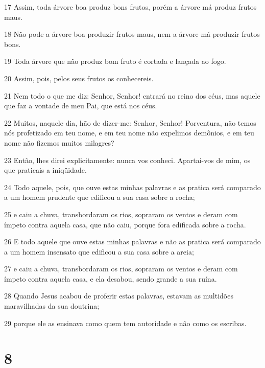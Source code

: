 \par 17 Assim, toda árvore boa produz bons frutos, porém a árvore má produz frutos maus.
\par 18 Não pode a árvore boa produzir frutos maus, nem a árvore má produzir frutos bons.
\par 19 Toda árvore que não produz bom fruto é cortada e lançada ao fogo.
\par 20 Assim, pois, pelos seus frutos os conhecereis.
\par 21 Nem todo o que me diz: Senhor, Senhor! entrará no reino dos céus, mas aquele que faz a vontade de meu Pai, que está nos céus.
\par 22 Muitos, naquele dia, hão de dizer-me: Senhor, Senhor! Porventura, não temos nós profetizado em teu nome, e em teu nome não expelimos demônios, e em teu nome não fizemos muitos milagres?
\par 23 Então, lhes direi explicitamente: nunca vos conheci. Apartai-vos de mim, os que praticais a iniqüidade.
\par 24 Todo aquele, pois, que ouve estas minhas palavras e as pratica será comparado a um homem prudente que edificou a sua casa sobre a rocha;
\par 25 e caiu a chuva, transbordaram os rios, sopraram os ventos e deram com ímpeto contra aquela casa, que não caiu, porque fora edificada sobre a rocha.
\par 26 E todo aquele que ouve estas minhas palavras e não as pratica será comparado a um homem insensato que edificou a sua casa sobre a areia;
\par 27 e caiu a chuva, transbordaram os rios, sopraram os ventos e deram com ímpeto contra aquela casa, e ela desabou, sendo grande a sua ruína.
\par 28 Quando Jesus acabou de proferir estas palavras, estavam as multidões maravilhadas da sua doutrina;
\par 29 porque ele as ensinava como quem tem autoridade e não como os escribas.

\chapter{8}

